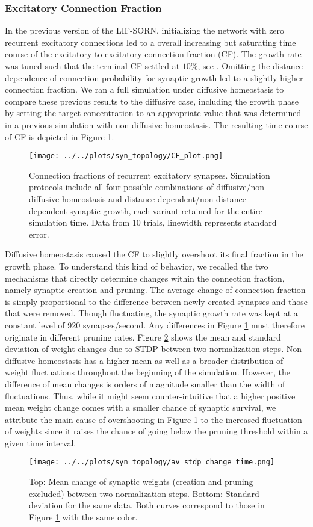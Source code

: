 \documentclass[10pt,a4paper]{article}
\begin{document}
\subsubsection{Excitatory Connection Fraction}
In the previous version of the LIF-SORN, initializing the network with zero recurrent excitatory connections led to a overall increasing but saturating time course of the excitatory-to-excitatory connection fraction (CF). The growth rate was tuned such that the terminal CF settled at $\mathrm{10\%}$, see \cite[p. 8]{SORN_Paper}. Omitting the distance dependence of connection probability for synaptic growth led to a slightly higher connection fraction. We ran a full simulation under diffusive homeostasis to compare these previous results to the diffusive case, including the growth phase by setting the target concentration to an appropriate value that was determined in a previous simulation with non-diffusive homeostasis. The resulting time course of CF is depicted in Figure \ref{CF_plot}.
\begin{figure}
\texttt{[image: ../../plots/syn\_topology/CF\_plot.png]}
\caption{Connection fractions of recurrent excitatory synapses. Simulation protocols include all four possible combinations of diffusive/non-diffusive homeostasis and distance-dependent/non-distance-dependent synaptic growth, each variant retained for the entire simulation time. Data from 10 trials, linewidth represents standard error.}
\label{CF_plot}
\end{figure}
Diffusive homeostasis caused the CF to slightly overshoot its final fraction in the growth phase. To understand this kind of behavior, we recalled the two mechanisms that directly determine changes within the connection fraction, namely synaptic creation and pruning. The average change of connection fraction is simply proportional to the difference between newly created synapses and those that were removed. Though fluctuating, the synaptic growth rate was kept at a constant level of 920 synapses/second. Any differences in Figure \ref{CF_plot} must therefore originate in different pruning rates. Figure \ref{STDP_change} shows the mean and standard deviation of weight changes due to STDP between two normalization steps. Non-diffusive homeostasis has a higher mean as well as a broader distribution of weight fluctuations throughout the beginning of the simulation. However, the difference of mean changes is orders of magnitude smaller than the width of fluctuations. Thus, while it might seem counter-intuitive that a higher positive mean weight change comes with a smaller chance of synaptic survival, we attribute the main cause of overshooting in Figure \ref{CF_plot} to the increased fluctuation of weights since it raises the chance of going below the pruning threshold within a given time interval.
\begin{figure}
\texttt{[image: ../../plots/syn\_topology/av\_stdp\_change\_time.png]}
\caption{Top: Mean change of synaptic weights (creation and pruning excluded) between two normalization steps. Bottom: Standard deviation for the same data. Both curves correspond to those in Figure \ref{CF_plot} with the same color.}
\label{STDP_change}
\end{figure}
\end{document}
